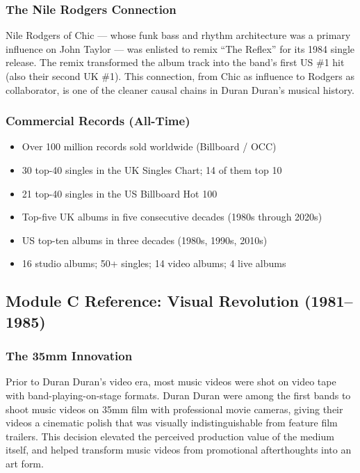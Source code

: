 \documentclass[11pt,letterpaper]{article}
\begin{document}
\subsubsection{The Nile Rodgers Connection}

Nile Rodgers of Chic --- whose funk bass and rhythm architecture was a primary influence on John Taylor --- was enlisted to remix ``The Reflex'' for its 1984 single release. The remix transformed the album track into the band's first US \#1 hit (also their second UK \#1). This connection, from Chic as influence to Rodgers as collaborator, is one of the cleaner causal chains in Duran Duran's musical history.

\subsubsection{Commercial Records (All-Time)}

\begin{itemize}
  \item Over 100 million records sold worldwide (Billboard / OCC)
  \item 30 top-40 singles in the UK Singles Chart; 14 of them top 10
  \item 21 top-40 singles in the US Billboard Hot 100
  \item Top-five UK albums in five consecutive decades (1980s through 2020s)
  \item US top-ten albums in three decades (1980s, 1990s, 2010s)
  \item 16 studio albums; 50+ singles; 14 video albums; 4 live albums
\end{itemize}

\subsection{Module C Reference: Visual Revolution (1981--1985)}

\subsubsection{The 35mm Innovation}

Prior to Duran Duran's video era, most music videos were shot on video tape with band-playing-on-stage formats. Duran Duran were among the first bands to shoot music videos on 35mm film with professional movie cameras, giving their videos a cinematic polish that was visually indistinguishable from feature film trailers. This decision elevated the perceived production value of the medium itself, and helped transform music videos from promotional afterthoughts into an art form.
\end{document}
